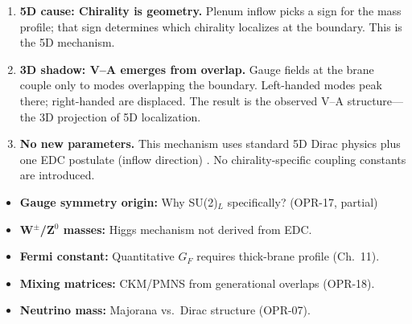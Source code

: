 \begin{tcolorbox}[colback=blue!5!white, colframe=blue!50!black,
    title=\textbf{Three Takeaways (5D Cause → 3D Shadow)}]
\begin{enumerate}
    \item \textbf{5D cause: Chirality is geometry.}
          Plenum inflow picks a sign for the mass profile; that sign determines which
          chirality localizes at the boundary. This is the 5D mechanism.

    \item \textbf{3D shadow: V–A emerges from overlap.}
          Gauge fields at the brane couple only to modes overlapping the boundary.
          Left-handed modes peak there; right-handed are displaced. The result is the
          observed V–A structure---the 3D projection of 5D localization.

    \item \textbf{No new parameters.}
          This mechanism uses standard 5D Dirac physics \tagBL{} plus one EDC postulate
          (inflow direction) \tagP{}. No chirality-specific coupling constants are introduced.
\end{enumerate}
\end{tcolorbox}

\medskip


\begin{tcolorbox}[colback=red!5!white, colframe=red!50!black,
    title=\textbf{What Remains Open}]
\begin{itemize}[nosep]
    \item \textbf{Gauge symmetry origin:} Why SU(2)$_L$ specifically? (OPR-17, partial)
    \item \textbf{W$^\pm$/Z$^0$ masses:} Higgs mechanism not derived from EDC.
    \item \textbf{Fermi constant:} Quantitative $G_F$ requires thick-brane profile (Ch.~11).
    \item \textbf{Mixing matrices:} CKM/PMNS from generational overlaps (OPR-18).
    \item \textbf{Neutrino mass:} Majorana vs.\ Dirac structure (OPR-07).
\end{itemize}
\end{tcolorbox}

\medskip


